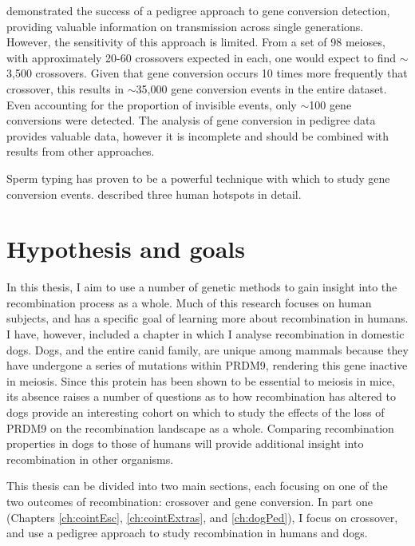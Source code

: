 \citet{Williams2015} demonstrated the success of a pedigree approach to gene conversion detection, providing valuable information on transmission across single generations.
However, the sensitivity of this approach is limited.
From a set of 98 meioses, with approximately 20-60 crossovers expected in each, one would expect to find $\sim$3,500 crossovers.
Given that gene conversion occurs 10 times more frequently that crossover, this results in $\sim$35,000 gene conversion events in the entire dataset.
Even accounting for the proportion of invisible events, only $\sim$100 gene conversions were detected.
The analysis of gene conversion in pedigree data provides valuable data, however it is incomplete and should be combined with results from other approaches.


Sperm typing has proven to be a powerful technique with which to study gene conversion events.
\citet{Jeffreys2004} described three human hotspots in detail.



\section{Hypothesis and goals}


In this thesis, I aim to use a number of genetic methods to gain insight into the recombination process as a whole.
Much of this research focuses on human subjects, and has a specific goal of learning more about recombination in humans.
I have, however, included a chapter in which I analyse recombination in domestic dogs.
Dogs, and the entire canid family, are unique among mammals because they have undergone a series of mutations within PRDM9, rendering this gene inactive in meiosis.
Since this protein has been shown to be essential to meiosis in mice, its absence raises a number of questions as to how recombination has altered to 
dogs provide an interesting cohort on which to study the effects of the loss of PRDM9 on the recombination landscape as a whole.
Comparing recombination properties in dogs to those of humans will provide additional insight into recombination in other organisms.

This thesis can be divided into two main sections, each focusing on one of the two outcomes of recombination: crossover and gene conversion.
In part one (Chapters \ref{ch:cointEsc}, \ref{ch:cointExtras}, and \ref{ch:dogPed}), I focus on crossover, and use a pedigree approach to study recombination in humans and dogs.


